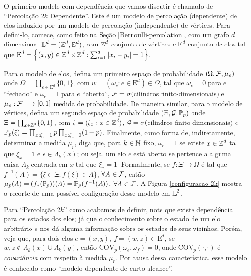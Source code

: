 \par O primeiro modelo com dependência que vamos discutir é chamado de ``Percolação $2k$ Dependente''. Este é um modelo de percolação (dependente) de elos induzido por um modelo de percolação (independente) de vértices. Para defini-lo, comece, como feito na Seção \ref{Bernoulli-percolation}, com um grafo $d$ dimensional $\operatorname{\mathbb{L}}^d = (\operatorname{\mathbb{Z}}^d, \text{E}^d)$, com $\operatorname{\mathbb{Z}}^d$ conjunto de vértices e $\text{E}^d$ conjunto de elos tal que $\text{E}^d = \left\{(x, y) \in \operatorname{\mathbb{Z}}^d \times \operatorname{\mathbb{Z}}^d : \sum_{i = 1}^{d} |x_i - y_i| = 1\right\}$.

\par Para o modelo de elos, defina um primeiro espaço de probabilidade $(\Omega, \operatorname{\mathcal{F}}, \mu_p)$ onde $\Omega = \prod_{e \in \text{E}^d} \{0, 1\}$, com $w = (\omega_e : e \in \text{E}^d) \in \Omega$, tal que $\omega_e = 0$ para $e$ ``fechado'' e $\omega_e = 1$ para $e$ ``aberto'', $\operatorname{\mathcal{F}} = \sigma($cilindros finito-dimensionais$)$ e $\mu_p: \operatorname{\mathcal{F}} \longrightarrow [0, 1]$ medida de probabilidade. De maneira similar, para o modelo de vértices, defina um segundo espaço de probabilidade $(\Xi, \operatorname{\mathcal{G}}, \operatorname{\mathbb{P}}_p)$ onde $\Xi = \prod_{x \in \operatorname{\mathbb{Z}}^d}\{0, 1\}$, com $\xi = (\xi_x : x \in \operatorname{\mathbb{Z}}^d)$, $\operatorname{\mathcal{G}} = \sigma($cilindros finito-dimensionais$)$ e $\operatorname{\mathbb{P}}_p(\xi) = \prod_{x:\xi_x = 1}p\prod_{x:\xi_x = 0}(1-p)$. Finalmente, como forma de, indiretamente, determinar a medida $\mu_p$, diga que, para $k \in \operatorname{\mathbb{N}}$ fixo, $\omega_e = 1$ se existe $x \in \operatorname{\mathbb{Z}}^d$ tal que $\xi_x = 1$ e $e \in \Lambda_k(x)$; ou seja, um elo $e$ está aberto se pertence a alguma caixa $\Lambda_k$ centrada em $x$ tal que $\xi_x = 1$. Formalmente, se $f: \Xi \longrightarrow \Omega$ é tal que $f^{-1}(A) = \{\xi \in \Xi : f(\xi) \in A\}$, $\forall A \in \operatorname{\mathcal{F}}$, então $\mu_p(A) = (f_{*}(\operatorname{\mathbb{P}}_p))(A) = \operatorname{\mathbb{P}}_p(f^{-1}(A))$, $\forall A \in \operatorname{\mathcal{F}}$. A Figura \ref{configuracao-2k} mostra o recorte de uma possível configuração desse modelo em $\operatorname{\mathbb{L}}^2$.

\par Para ``Percolação $2k$'' como acabamos de definir, note que existe dependência para os estados dos elos; já que o conhecimento sobre o estado de um elo arbitrário $e$ nos dá alguma informação sobre os estados de seus vizinhos. Porém, veja que, para dois elos $e = (x, y), ~f = (w, z) \in \text{E}^d$, se $w, z \not\in \Lambda_k(x) \cup \Lambda_k(y)$, então $\text{COV}_p(\omega_e, \omega_f) = 0$, onde $\text{COV}_p(\cdot, \cdot)$ é \textit{covariância} com respeito à medida $\mu_p$. Por causa dessa característica, esse modelo é conhecido como ``modelo dependente de curto alcance''.\vspace{9pt}

